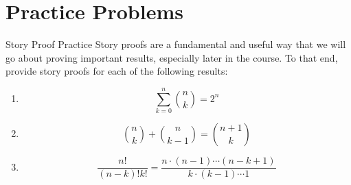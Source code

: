 \documentclass[11pt]{article}
\begin{document}
\section*{Practice Problems}
\begin{exercise}{Story Proof Practice}
Story proofs are a fundamental and useful way that we will go about proving important results, especially later in the course. To that end, provide story proofs for each of the following results:

\begin{enumerate}
    \item
    $$\sum_{k=0}^n {n \choose k } = 2^n$$
    \item 
    $${n \choose k} + {n \choose k-1} = 
    {n+1 \choose k}$$
    \item 
    $$\frac{n!}{(n-k)!k!} = \frac{n \cdot (n-1)
    \dotsm (n-k+1)}{k\cdot (k-1)\dotsm 1}$$
\end{enumerate}
\end{exercise}
\end{document}
